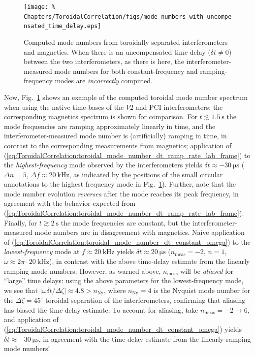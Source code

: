 \begin{figure}
  \centering
  \texttt{[image: \%
    Chapters/ToroidalCorrelation/figs/mode\_numbers\_with\_uncompensated\_time\_delay.eps]}
  \caption[Effect of uncompensated time delay on computed toroidal mode numbers]{%
    Computed mode numbers from
    toroidally separated interferometers and magnetics.
    When there is an uncompensated time delay ($\delta t \neq 0$)
    between the two interferometers, as there is here,
    the interferometer-measured mode numbers
    for both constant-frequency and ramping-frequency modes
    are \emph{incorrectly} computed.}
\label{fig:ToroidalCorrelation:uncompensated_time_delay}
\end{figure}

\graffito{\textcolor{red}{Improve discussion of two estimates}}
Now, Fig.~\ref{fig:ToroidalCorrelation:uncompensated_time_delay} shows an example
of the computed toroidal mode number spectrum
when using the native time-bases of the $V2$ and PCI interferometers;
the corresponding magnetics spectrum is shown for comparison.
For $t \lesssim \SI{1.5}{\second}$
the mode frequencies are ramping approximately linearly in time, and
the interferometer-measured mode number is (artificially) ramping in time,
in contrast to the corresponding measurements from magnetics;
application of
(\ref{eq:ToroidalCorrelation:toroidal_mode_number_dt_ramp_rate_lab_frame})
to the \emph{highest-frequency} mode observed by the interferometers yields
$\delta t \approx \SI{-30}{\micro\second}$
($\Delta n = 5$, $\Delta f \approx \SI{20}{\kilo\hertz}$,
as indicated by the positions of the small circular annotations
to the highest frequency mode in
Fig.~\ref{fig:ToroidalCorrelation:uncompensated_time_delay}).
Further, note that the mode number evolution \emph{reverses}
after the mode reaches its peak frequency,
in agreement with the behavior expected from
(\ref{eq:ToroidalCorrelation:toroidal_mode_number_dt_ramp_rate_lab_frame}).
Finally, for $t \gtrsim \SI{2}{\second}$
the mode frequencies are constant, but
the interferometer-measured mode numbers are in disagreement with magnetics.
Naive application of
(\ref{eq:ToroidalCorrelation:toroidal_mode_number_dt_constant_omega})
to the \emph{lowest-frequency} mode at $f \approx \SI{20}{\kilo\hertz}$
yields $\delta t \approx \SI{20}{\micro\second}$
($n_{\text{meas}} = -2$, $n = 1$,
$\omega \approx 2 \pi \cdot \SI{20}{\kilo\hertz}$),
in contrast with the above time-delay estimate
from the linearly ramping mode numbers.
However, as warned above,
$n_{\text{meas}}$ will be \emph{aliased} for ``large'' time delays:
using the above parameters for the lowest-frequency mode,
we see that $|\omega \delta t / \Delta \zeta| \approx 4.8 > n_{\text{Ny}}$,
where $n_{\text{Ny}} = 4$ is the Nyquist mode number
for the $\Delta \zeta = 45^{\circ}$ toroidal separation of the interferometers,
confirming that aliasing has biased the time-delay estimate.
To account for aliasing, take $n_{\text{meas}} = -2 \rightarrow 6$, and
application of
(\ref{eq:ToroidalCorrelation:toroidal_mode_number_dt_constant_omega}) yields
$\delta t \approx -\SI{30}{\micro\second}$,
in agreement with the time-delay estimate
from the linearly ramping mode numbers!

